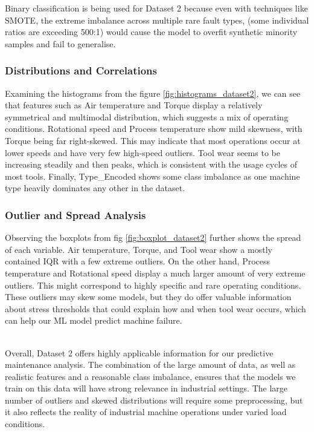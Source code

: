 \documentclass[11pt]{article}
\begin{document}
Binary classification is being used for Dataset 2 because even with techniques like SMOTE, the extreme imbalance across multiple rare fault types, (some individual ratios are exceeding 500:1) would cause the model to overfit synthetic minority samples and fail to generalise.

\subsubsection*{Distributions and Correlations}
Examining the histograms from the figure \ref{fig:histograms_dataset2}, we can see that features such as Air temperature and Torque display a relatively symmetrical and multimodal distribution, which suggests a mix of operating conditions. Rotational speed and Process temperature show mild skewness, with Torque being far right-skewed. This may indicate that most operations occur at lower speeds and have very few high-speed outliers. Tool wear seems to be increasing steadily and then peaks, which is consistent with the usage cycles of most tools. Finally, Type\_Encoded shows some class imbalance as one machine type heavily dominates any other in the dataset.

\subsubsection*{Outlier and Spread Analysis}
Observing the boxplots from fig \ref{fig:boxplot_dataset2} further shows the spread of each variable. Air temperature, Torque, and Tool wear show a mostly contained IQR with a few extreme outliers. On the other hand, Process temperature and Rotational speed display a much larger amount of very extreme outliers. This might correspond to highly specific and rare operating conditions. These outliers may skew some models, but they do offer valuable information about stress thresholds that could explain how and when tool wear occurs, which can help our ML model predict machine failure.\\\

Overall, Dataset 2 offers highly applicable information for our predictive maintenance analysis. The combination of the large amount of data, as well as realistic features and a reasonable class imbalance, ensures that the models we train on this data will have strong relevance in industrial settings. The large number of outliers and skewed distributions will require some preprocessing, but it also reflects the reality of industrial machine operations under varied load conditions. 
\end{document}
